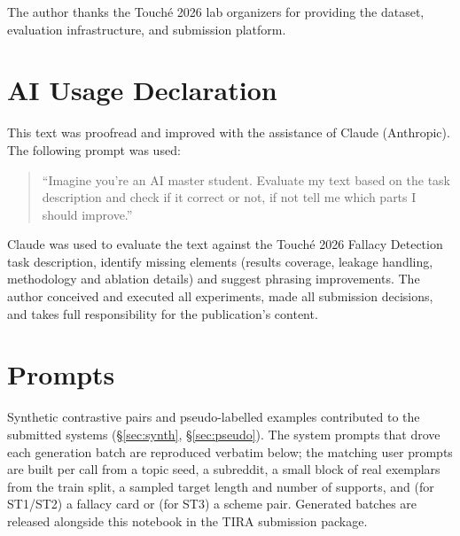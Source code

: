 \documentclass{ceurart}
\begin{document}
\begin{acknowledgments}
The author thanks the Touch\'{e} 2026 lab organizers for providing
the dataset, evaluation infrastructure, and submission platform.
\end{acknowledgments}

\section*{AI Usage Declaration}
This text was proofread and improved with the assistance of
Claude (Anthropic). The following prompt was used:

\begin{quote}
``Imagine you're an AI master student. Evaluate my text based on the
task description and check if it correct or not, if not tell me which
parts I should improve.''
\end{quote}

\noindent Claude was used to evaluate the text against the
Touch\'{e} 2026 Fallacy Detection task description, identify missing
elements (results coverage, leakage handling, methodology and ablation
details) and suggest phrasing improvements. The author conceived and
executed all experiments, made all submission decisions, and takes full
responsibility for the publication's content.



\appendix

\section{Prompts}
\label{app:prompts}

Synthetic contrastive pairs and pseudo-labelled examples contributed to
the submitted systems (\S\ref{sec:synth}, \S\ref{sec:pseudo}). The system
prompts that drove each generation batch are reproduced verbatim below;
the matching user prompts are built per call from a topic seed, a
subreddit, a small block of real exemplars from the train split, a
sampled target length and number of supports, and (for ST1/ST2) a
fallacy card or (for ST3) a scheme pair. Generated batches are released
alongside this notebook in the TIRA submission package.
\end{document}
